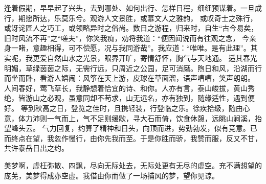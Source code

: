 \begin{adjustwidth}{0cm}{0cm}
{        \hspace*{2em} 逢着假期，早早起了兴头，去到哪处、如何出行、怎样日程，细细预谋着。一旦成行，期愿所达，乐莫乐兮。观游人文景胜，或慕文人之雅韵，
        或叹奇士之殊行，或讶诧匠人之巧工，或领略异时之俗尚。数日之游程，归来时，自生“古今易矣，旧时风流不再”之“嗟夫”，你笑我痴，劝将我道：“便因闻说而有往观之念，
        今亲身一睹，意趣相得，可不偿愿，况与我同游哉”。我应道：“唯唯。是有此理”。其实呢，我更爱自然山水之光景，眼界开旷，寄情舒怀，胸气与天地通。
        适其春光明媚，草绿茵茵之际，无需行远，只周近之公园，足可消磨。煦日和风，沿湖而行而坐而卧，看游人嬉闹：风筝在天上游，皮球在草面溜，语声嘈嘈，笑声朗朗。
        人间春好，莺飞草长，我静想着恰宜的诗、和你。人亦有言，泰山峻拔，黄山秀绝，皆游山之必观，虽意同却不苟求，山无远名，亦有独到，随缘适性，遇到便好。
        等到秋高之日，登览之佳时，且携轻装，行登临之乐。徐疾拾级，随由心意，体力沛则一气而上，气不足则缓歇，寻大石而倚，饮食休憩，远眺山涧溪，抬望峰头云。
        气力回复，约算了精神和日头，向顶而进，势劲勃发，似有竞意。已而终点在望，我忽作慢行，由你先我而至。于是你胜而骄，我赞而服，反又不甘，共许泰岳日出之约。

        \hspace*{2em} 美梦啊，虚枉弥散、四飘，尽向无际处去，无际处更有无尽的虚空。充不满想望的庞芜，美梦得成亦空虚。我借由你而做了一场捕风的梦，望你见谅。
    }
\end{adjustwidth}
\newpage